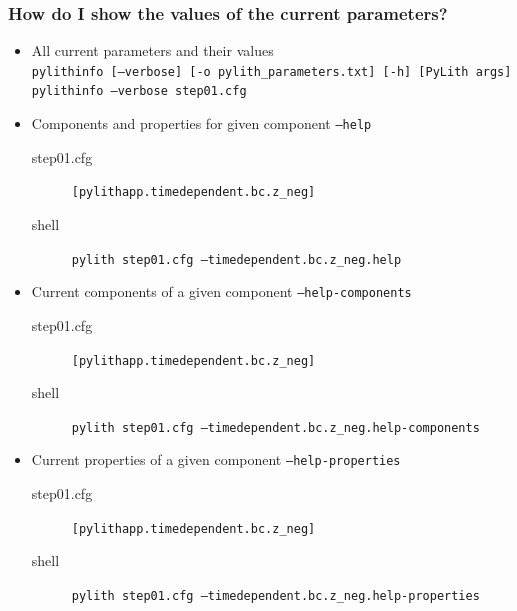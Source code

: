 \documentclass[aspectration=169]{beamer}
\newcommand{\cfg}[1]{{\footnotesize\tt \color{blue}#1}}
\newcommand{\cmd}[1]{{\footnotesize\tt \color{ltred}#1}}
\begin{document}
\begin{frame}
  \frametitle{How do I show the values of the current parameters?}

  \begin{itemize}
  \item All current parameters and their values\\
    \cmd{pylithinfo [--verbose] [-o pylith\_parameters.txt] [-h] [PyLith args]}\\
    \cmd{pylithinfo --verbose step01.cfg}
  \item Components and properties for given component \cmd{--help}
    \begin{description}
    \item[step01.cfg] \cfg{[pylithapp.timedependent.bc.z\_neg]}
    \item[shell] \cmd{pylith step01.cfg --timedependent.bc.z\_neg.help}
    \end{description}
  \item Current components of a given component \cmd{--help-components}
    \begin{description}
    \item[step01.cfg] \cfg{[pylithapp.timedependent.bc.z\_neg]}
    \item[shell] \cmd{pylith step01.cfg --timedependent.bc.z\_neg.help-components}
    \end{description}
  \item Current properties of a given component \cmd{--help-properties}
    \begin{description}
    \item[step01.cfg] \cfg{[pylithapp.timedependent.bc.z\_neg]}
    \item[shell] \cmd{pylith step01.cfg --timedependent.bc.z\_neg.help-properties}
    \end{description}
  \end{itemize}

\end{frame}
\end{document}
